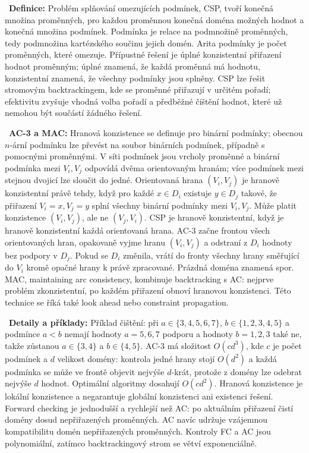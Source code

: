 \begin{odpoved}
\setlength{\parskip}{2pt}
\noindent{}\ \textbf{Definice:} Problém splňování omezujících podmínek, CSP, tvoří konečná množina proměnných, pro každou proměnnou konečná doména možných hodnot a konečná množina podmínek. Podmínka je relace na podmnožině proměnných, tedy podmnožina kartézského součinu jejich domén. Arita podmínky je počet proměnných, které omezuje. Přípustné řešení je úplné konzistentní přiřazení hodnot proměnným; úplné znamená, že každá proměnná má hodnotu, konzistentní znamená, že všechny podmínky jsou splněny. CSP lze řešit stromovým backtrackingem, kde se proměnné přiřazují v určitém pořadí; efektivitu zvyšuje vhodná volba pořadí a předběžné čištění hodnot, které už nemohou být součástí žádného řešení.\par
\noindent{}\ \textbf{AC-3 a MAC:} Hranová konzistence se definuje pro binární podmínky; obecnou $n$-ární podmínku lze převést na soubor binárních podmínek, případně s pomocnými proměnnými. V síti podmínek jsou vrcholy proměnné a binární podmínka mezi $V_i,V_j$ odpovídá dvěma orientovaným hranám; více podmínek mezi stejnou dvojicí lze sloučit do jedné. Orientovaná hrana $(V_i,V_j)$ je hranově konzistentní právě tehdy, když pro každé $x\in D_i$ existuje $y\in D_j$ takové, že přiřazení $V_i=x,V_j=y$ splní všechny binární podmínky mezi $V_i,V_j$. Může platit konzistence $(V_i,V_j)$, ale ne $(V_j,V_i)$. CSP je hranově konzistentní, když je hranově konzistentní každá orientovaná hrana. AC-3 začne frontou všech orientovaných hran, opakovaně vyjme hranu $(V_i,V_j)$ a odstraní z $D_i$ hodnoty bez podpory v $D_j$. Pokud se $D_i$ změnila, vrátí do fronty všechny hrany směřující do $V_i$ kromě opačné hrany k právě zpracované. Prázdná doména znamená spor. MAC, maintaining arc consistency, kombinuje backtracking s AC: nejprve problém zkonzistentní, po každém přiřazení obnoví hranovou konzistenci. Této technice se říká také look ahead nebo constraint propagation.\par
\noindent{}\ \textbf{Detaily a příklady:} Příklad čištění: při $a\in\{3,4,5,6,7\}$, $b\in\{1,2,3,4,5\}$ a podmínce $a<b$ nemají hodnoty $a=5,6,7$ podporu a hodnoty $b=1,2,3$ také ne, takže zůstanou $a\in\{3,4\}$ a $b\in\{4,5\}$. AC-3 má složitost $O(cd^3)$, kde $c$ je počet podmínek a $d$ velikost domény: kontrola jedné hrany stojí $O(d^2)$ a každá podmínka se může ve frontě objevit nejvýše $d$-krát, protože z domény lze odebrat nejvýše $d$ hodnot. Optimální algoritmy dosahují $O(cd^2)$. Hranová konzistence je lokální konzistence a negarantuje globální konzistenci ani existenci řešení. Forward checking je jednodušší a rychlejší než AC: po aktuálním přiřazení čistí domény dosud nepřiřazených proměnných. AC navíc udržuje vzájemnou kompatibilitu domén nepřiřazených proměnných. Kontroly FC a AC jsou polynomiální, zatímco backtrackingový strom se větví exponenciálně.
\end{odpoved}

